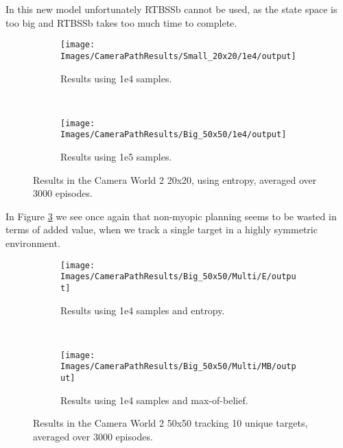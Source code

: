 In this new model unfortunately RTBSSb cannot be used, as the state space is too big and RTBSSb
takes too much time to complete.

\begin{figure}[ht!]
        \centering
        \begin{subfigure}[t]{0.45\textwidth}
                \texttt{[image: Images/CameraPathResults/Small\_20x20/1e4/output]}
                \caption{Results using 1e4 samples.}
                \label{fig:cps4e}
        \end{subfigure}%
        ~ %
        \begin{subfigure}[t]{0.45\textwidth}
                \texttt{[image: Images/CameraPathResults/Big\_50x50/1e4/output]}
                \caption{Results using 1e5 samples.}
                \label{fig:cps5e}
        \end{subfigure}
        \caption{Results in the Camera World 2 20x20, using entropy, averaged over 3000 episodes.}
        \label{fig:cpse}
\end{figure}

In Figure \ref{fig:cpse} we see once again that non-myopic planning seems to be wasted in terms of
added value, when we track a single target in a highly symmetric environment.

\begin{figure}[ht]
        \centering
        \begin{subfigure}[t]{0.5\textwidth}
                \texttt{[image: Images/CameraPathResults/Big\_50x50/Multi/E/output]}
                \caption{Results using 1e4 samples and entropy.}
                \label{fig:cpb4e10}
        \end{subfigure}%
        ~ %
        \begin{subfigure}[t]{0.5\textwidth}
                \texttt{[image: Images/CameraPathResults/Big\_50x50/Multi/MB/output]}
                \caption{Results using 1e4 samples and max-of-belief.}
                \label{fig:cpb5mb10}
        \end{subfigure}
        \caption{Results in the Camera World 2 50x50 tracking 10 unique targets, averaged over 3000 episodes.}\label{fig:cpb10}
\end{figure}

